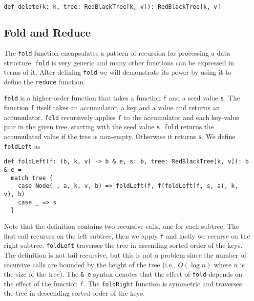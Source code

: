 \documentclass[../main.tex]{subfiles}
\begin{document}
\begin{lstlisting}[language=Flix]
def delete(k: k, tree: RedBlackTree[k, v]): RedBlackTree[k, v]
\end{lstlisting}

\subsection{Fold and Reduce}

The \lstinline{fold} function encapsulates a pattern of recursion for processing a data structure. \lstinline{fold} is very generic and many other functions can be expressed in terms of it. After defining \lstinline{fold} we will demonstrate its power by using it to define the \lstinline{reduce} function.

\lstinline{fold} is a higher-order function that takes a function \lstinline{f} and a seed value \lstinline{s}. The function \lstinline{f} itself takes an accumulator, a key and a value and returns an accumulator. \lstinline{fold} recursively applies \lstinline{f} to the accumulator and each key-value pair in the given tree, starting with the seed value \lstinline{s}. \lstinline{fold} returns the accumulated value if the tree is non-empty. Otherwise it returns \lstinline{s}. We define \lstinline{foldLeft} as
\begin{lstlisting}[language=Flix]
def foldLeft(f: (b, k, v) -> b & e, s: b, tree: RedBlackTree[k, v]): b & e =
  match tree {
    case Node(_, a, k, v, b) => foldLeft(f, f(foldLeft(f, s, a), k, v), b)
    case _ => s
  }
\end{lstlisting}
Note that the definition contains two recursive calls, one for each subtree. The first call recurses on the left subtree, then we apply \lstinline{f} and lastly we recurse on the right subtree. \lstinline{foldLeft} traverses the tree in ascending sorted order of the keys. The definition is not tail-recursive, but this is not a problem since the number of recursive calls are bounded by the height of the tree (i.e., $O(\log{n})$ where $n$ is the size of the tree). The \lstinline{& e} syntax denotes that the effect of \lstinline{fold} depends on the effect of the function \lstinline{f}. The \lstinline{foldRight} function is symmetric and traverses the tree in descending sorted order of the keys.
\end{document}
